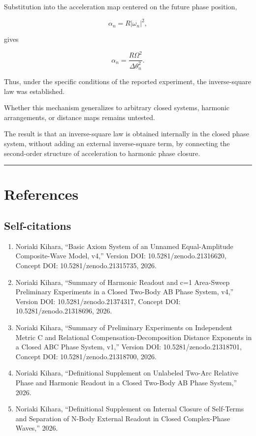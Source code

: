 \documentclass[
  10pt,
  a4paper,
]{article}
\providecommand{\tightlist}{%
  \setlength{\itemsep}{0pt}\setlength{\parskip}{0pt}}
\begin{document}
Substitution into the acceleration map centered on the future phase
position,

\[
\alpha_n=R|\omega_n|^2,
\]

gives

\[
\boxed{
\alpha_n
=\frac{R\Omega^2}{\Delta\theta_n^2}
}.
\]

Thus, under the specific conditions of the reported experiment, the
inverse-square law was established.

Whether this mechanism generalizes to arbitrary closed systems, harmonic
arrangements, or distance maps remains untested.

The result is that an inverse-square law is obtained internally in the
closed phase system, without adding an external inverse-square term, by
connecting the second-order structure of acceleration to harmonic phase
closure.

\begin{center}\rule{0.5\linewidth}{0.5pt}\end{center}

\section{References}\label{references}

\subsection{Self-citations}\label{self-citations}

\begin{enumerate}
\def\labelenumi{\arabic{enumi}.}
\tightlist
\item
  Noriaki Kihara, ``Basic Axiom System of an Unnamed Equal-Amplitude
  Composite-Wave Model, v4,'' Version DOI: 10.5281/zenodo.21316620,
  Concept DOI: 10.5281/zenodo.21315735, 2026.
\item
  Noriaki Kihara, ``Summary of Harmonic Readout and c=1 Area-Sweep
  Preliminary Experiments in a Closed Two-Body AB Phase System, v4,''
  Version DOI: 10.5281/zenodo.21374317, Concept DOI:
  10.5281/zenodo.21318696, 2026.
\item
  Noriaki Kihara, ``Summary of Preliminary Experiments on Independent
  Metric C and Relational Compensation-Decomposition Distance Exponents
  in a Closed ABC Phase System, v1,'' Version DOI:
  10.5281/zenodo.21318701, Concept DOI: 10.5281/zenodo.21318700, 2026.
\item
  Noriaki Kihara, ``Definitional Supplement on Unlabeled Two-Arc
  Relative Phase and Harmonic Readout in a Closed Two-Body AB Phase
  System,'' 2026.
\item
  Noriaki Kihara, ``Definitional Supplement on Internal Closure of
  Self-Terms and Separation of N-Body External Readout in Closed
  Complex-Phase Waves,'' 2026.
\end{enumerate}
\end{document}
